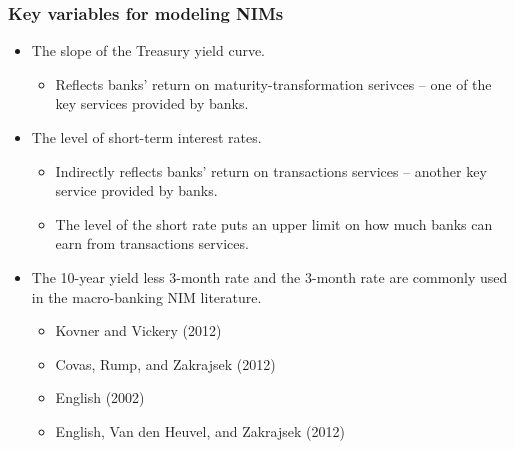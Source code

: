 \documentclass[handout]{beamer}
\begin{document}
\begin{frame}
\frametitle{Key variables for modeling NIMs}
\begin{itemize}
\item \vspace{0.0in} The slope of the Treasury yield curve.
\begin{itemize}
\item \vspace{0.05in} Reflects banks' return on maturity-transformation serivces -- one of the key services provided by banks.
\end{itemize}
\item \vspace{0.1in} The level of short-term interest rates.
\begin{itemize}
\item \vspace{0.05in} Indirectly reflects banks' return on transactions services -- another key service provided by banks.
\item \vspace{0.05in} The level of the short rate puts an upper limit on how much banks can earn from transactions services.
\end{itemize}
\item \vspace{0.1in} The 10-year yield less 3-month rate and the 3-month rate are commonly used in the macro-banking NIM literature.
\begin{itemize}
\item \vspace{0.05in} Kovner and Vickery (2012)
\item \vspace{0.05in} Covas, Rump, and Zakrajsek (2012)
\item \vspace{0.05in} English (2002)
\item \vspace{0.05in} English, Van den Heuvel, and Zakrajsek (2012)
\end{itemize}
\end{itemize}
\end{frame}
\end{document}
